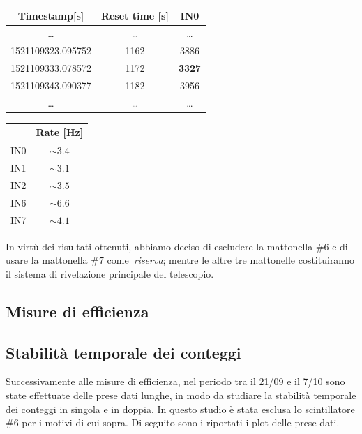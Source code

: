 \documentclass[11pt,a4paper]{article}
\begin{document}
    \begin{table}
    \begin{subtable}[c]{0.6\textwidth}
        \centering
        \begin{tabular}{ccc}
        \hline
        Timestamp[s] & Reset time [s] & IN0 \\
        \hline
        \hline
        \ldots & \ldots & \ldots\\
        1521109323.095752 & 1162 & 3886 \\
        1521109333.078572 & 1172 & \textbf{3327} \\
        1521109343.090377 & 1182 & 3956 \\
        \ldots & \ldots & \ldots\\
        \hline
        \end{tabular}
        \label{tab:outlier}
    \end{subtable}
    \begin{subtable}[c]{0.4\textwidth}
        \centering
        \begin{tabular}{cc}
        \hline
        & Rate [Hz] \\
        \hline
        \hline
        IN0 & $\sim 3.4$ \\
        IN1 & $\sim 3.1$ \\
        IN2 & $\sim 3.5$ \\
        IN6 & $\sim 6.6$ \\
        IN7 & $\sim 4.1$ \\
        \hline
        \end{tabular}
        \label{tab:rate_20210921}
    \end{subtable}
    \end{table}
    In virtù dei risultati ottenuti, abbiamo deciso di escludere la mattonella $\#6$ e di usare la mattonella $\#7$ come~\textit{riserva}; mentre le altre tre mattonelle costituiranno il sistema di rivelazione principale del telescopio.

    \subsection{Misure di efficienza}\label{subsec:misure-di-efficienza}

    \subsection{Stabilità temporale dei conteggi}\label{subsec:stabilita'-temporale-dei-conteggi}
    Successivamente alle misure di efficienza, nel periodo tra il 21/09 e il 7/10 sono state effettuate delle prese dati lunghe, in modo da studiare la stabilità temporale dei conteggi in singola e in doppia.
    In questo studio è stata esclusa lo scintillatore $\#6$ per i motivi di cui sopra.
    Di seguito sono i riportati i plot delle prese dati.
\end{document}
